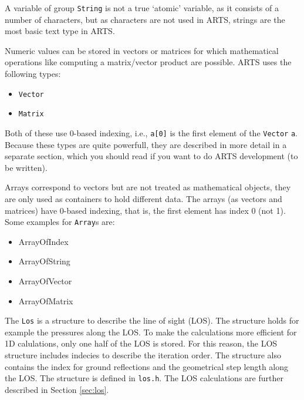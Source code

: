 A variable of group \verb|String| is not a true `atomic' variable, as
it consists of a number of characters, but as characters are not used
in ARTS, strings are the most basic text type in ARTS.
  

\label{sec:formats:nummath}
 
Numeric values can be stored in vectors or matrices for which
mathematical operations like computing a matrix/vector product are
possible. ARTS uses the following types:

\begin{itemize}
\item \verb|Vector|
\item \verb|Matrix|
\end{itemize}
Both of these use 0-based indexing, i.e., \verb|a[0]| is the first
element of the \verb|Vector| \verb|a|.  Because these types are quite
powerfull, they are described in more detail in a separate section,
which you should read if you want to do ARTS development (to be written). 

 \label{sec:formats:atomic_arrays}
 
Arrays correspond to vectors but are not treated as mathematical
objects, they are only used as containers to hold different data.
The arrays (as vectors and matrices) have 0-based indexing, that is,
the first element has index 0 (not 1). Some examples for \verb|Array|s
are:

\begin{itemize}
\item ArrayOfIndex
\item ArrayOfString
\item ArrayOfVector
\item ArrayOfMatrix
\end{itemize}


The \verb|Los| is a structure to describe the line of sight (LOS).
The structure holds for example the pressures along the LOS. To make the
calculations more efficient for 1D calulations, only one half of the
LOS is stored.  For this reason, the LOS structure includes indecies
to describe the iteration order. The structure also contains the
index for ground reflections and the geometrical step length along
the LOS. The structure is defined in \verb|los.h|.
The LOS calculations are further described in Section \ref{sec:los}.



